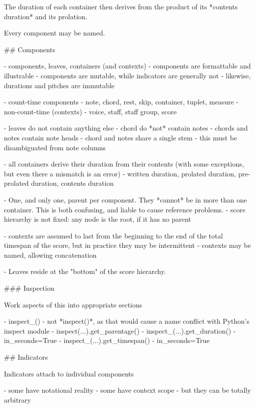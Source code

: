 \begin{markdown}

The duration of each container then derives from the product of its *contents
duration* and its prolation. 

Every component may be named.

## Components

-   components, leaves, containers (and contexts)
-   components are formattable and illustrable 
-   components are mutable, while indicators are generally not
    -   likewise, durations and pitches are immutable
    
-   count-time components
    -   note, chord, rest, skip, container, tuplet, measure
-   non-count-time (contexts)
    -   voice, staff, staff group, score

-   leaves do not contain anything else
    -   chord do *not* contain notes
    -   chords and notes contain note heads
    -   chord and notes share a single stem
    -   this must be disambiguated from note columns

-   all containers derive their duration from their contents (with some
    exceptions, but even there a mismatch is an error)
-   written duration, prolated duration, pre-prolated duration, contents
    duration

-   One, and only one, parent per component. They *cannot* be in more than one
    container. This is both confusing, and liable to cause reference problems.
-   score hierarchy is not fixed: any node is the root, if it has no parent

-   contexts are assumed to last from the beginning to the end of the total
    timespan of the score, but in practice they may be intermittent
-   contexts may be named, allowing concatenation

-   Leaves reside at the "bottom" of the score hierarchy.

### Inspection

Work aspects of this into appropriate sections

-   inspect_()
-   not *inspect()*, as that would cause a name conflict with Python's inspect
    module
-   inspect(...).get_parentage()
-   inspect_(...).get_duration()
    -   in_seconds=True
-   inspect_(...).get_timespan()
    -   in_seconds=True

## Indicators

Indicators attach to individual components

-   some have notational reality
-   some have context scope
-   but they can be totally arbitrary


\end{markdown}
